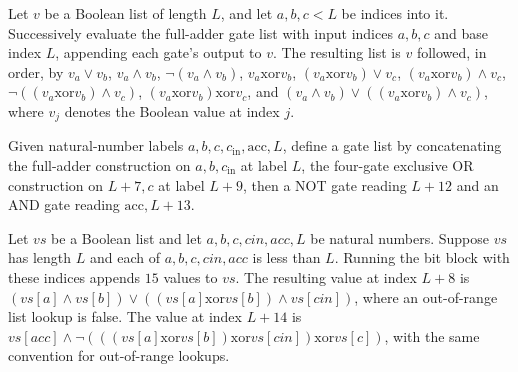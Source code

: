 \begin{theorem}
\label{BoolCircuit.runWith_fullAdderGates}
\leanok
{}
Let $v$ be a Boolean list of length $L$, and let $a,b,c<L$ be indices into it.
Successively evaluate the full-adder gate list with input indices $a,b,c$ and base index
$L$, appending each gate's output to $v$. The resulting list is $v$ followed, in order,
by $v_a\lor v_b$, $v_a\land v_b$, $\neg(v_a\land v_b)$, $v_a\mathbin{\mathrm{xor}}v_b$,
$(v_a\mathbin{\mathrm{xor}}v_b)\lor v_c$, $(v_a\mathbin{\mathrm{xor}}v_b)\land v_c$,
$\neg((v_a\mathbin{\mathrm{xor}}v_b)\land v_c)$,
$(v_a\mathbin{\mathrm{xor}}v_b)\mathbin{\mathrm{xor}}v_c$, and $(v_a\land
v_b)\lor((v_a\mathbin{\mathrm{xor}}v_b)\land v_c)$, where $v_j$ denotes the Boolean
value at index $j$.
\end{theorem}

\begin{definition}
\label{BoolCircuit.RippleCarry.bitBlock}
\leanok
{}
Given natural-number labels $a,b,c,c_{\mathrm{in}},\mathrm{acc},L$, define a gate list
by concatenating the full-adder construction on $a,b,c_{\mathrm{in}}$ at label $L$, the
four-gate exclusive OR construction on $L+7,c$ at label $L+9$, then a NOT gate reading
$L+12$ and an AND gate reading $\mathrm{acc},L+13$.
\end{definition}

\begin{theorem}
\label{BoolCircuit.RippleCarry.runWith_bitBlock}
\leanok
{}
Let $vs$ be a Boolean list and let $a,b,c,cin,acc,L$ be natural numbers. Suppose $vs$
has length $L$ and each of $a,b,c,cin,acc$ is less than $L$. Running the bit block with
these indices appends $15$ values to $vs$. The resulting value at index $L+8$ is
$(vs[a]\land vs[b])\lor((vs[a]\mathbin{\mathrm{xor}}vs[b])\land vs[cin])$, where an
out-of-range list lookup is false. The value at index $L+14$ is
$vs[acc]\land\neg(((vs[a]\mathbin{\mathrm{xor}}vs[b])\mathbin{\mathrm{xor}}vs[cin])\mathbin{\mathrm{xor}}vs[c])$,
with the same convention for out-of-range lookups.
\end{theorem}

